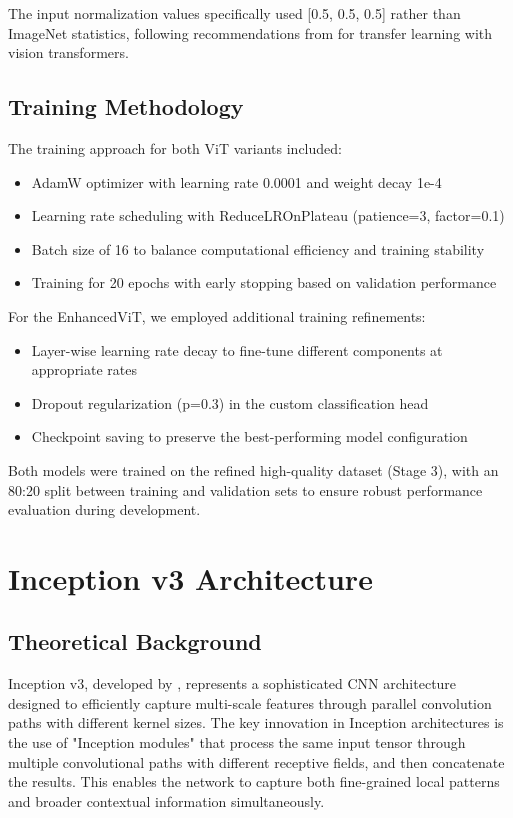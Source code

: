 \documentclass[a4paper,12pt]{article}
\begin{document}
The input normalization values specifically used [0.5, 0.5, 0.5] rather than ImageNet statistics, following recommendations from\citep{touvron2021training} for transfer learning with vision transformers.

\subsection{Training Methodology}

The training approach for both ViT variants included:

\begin{itemize}
    \item AdamW optimizer with learning rate 0.0001 and weight decay 1e-4
    \item Learning rate scheduling with ReduceLROnPlateau (patience=3, factor=0.1)
    \item Batch size of 16 to balance computational efficiency and training stability
    \item Training for 20 epochs with early stopping based on validation performance
\end{itemize}

For the EnhancedViT, we employed additional training refinements:

\begin{itemize}
    \item Layer-wise learning rate decay to fine-tune different components at appropriate rates
    \item Dropout regularization (p=0.3) in the custom classification head
    \item Checkpoint saving to preserve the best-performing model configuration
\end{itemize}

Both models were trained on the refined high-quality dataset (Stage 3), with an 80:20 split between training and validation sets to ensure robust performance evaluation during development.

\section{Inception v3 Architecture}

\subsection{Theoretical Background}

Inception v3, developed by \citep{szegedy2016rethinking}, represents a sophisticated CNN architecture designed to efficiently capture multi-scale features through parallel convolution paths with different kernel sizes. The key innovation in Inception architectures is the use of "Inception modules" that process the same input tensor through multiple convolutional paths with different receptive fields, and then concatenate the results. This enables the network to capture both fine-grained local patterns and broader contextual information simultaneously.
\end{document}
